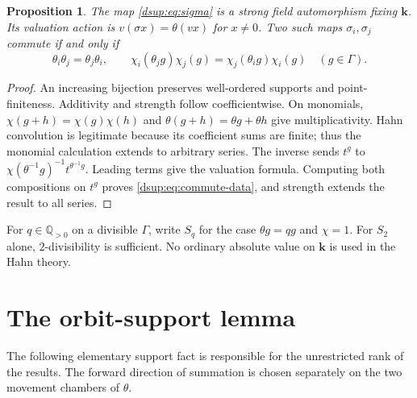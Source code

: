 \documentclass[11pt,oneside]{article}
\numberwithin{equation}{section}
\newtheorem{proposition}[theorem]{Proposition}
\theoremstyle{definition}
\theoremstyle{remark}
\newcommand{\Q}{\mathbb Q}
\newcommand{\kk}{\mathbf k}
\begin{document}
\begin{proposition}\label{dsup:prop:monomial}
The map \eqref{dsup:eq:sigma} is a strong field automorphism fixing $\kk$.
Its valuation action is $v(\sigma x)=\theta(vx)$ for $x\ne0$. Two such
maps $\sigma_i,\sigma_j$ commute if and only if
\begin{equation}\label{dsup:eq:commute-data}
 \theta_i\theta_j=\theta_j\theta_i,\qquad
 \chi_i(\theta_jg)\chi_j(g)=\chi_j(\theta_i g)\chi_i(g)
 \quad(g\in\Gamma).
\end{equation}
\end{proposition}
\begin{proof}
An increasing bijection preserves well-ordered supports and point-finiteness.
Additivity and strength follow coefficientwise. On monomials,
$\chi(g+h)=\chi(g)\chi(h)$ and $\theta(g+h)=\theta g+\theta h$ give
multiplicativity. Hahn convolution is legitimate because its coefficient
sums are finite; thus the monomial calculation extends to arbitrary
series. The inverse sends $t^g$ to
$\chi(\theta^{-1}g)^{-1}t^{\theta^{-1}g}$. Leading terms give the valuation
formula. Computing both compositions on $t^g$ proves
\eqref{dsup:eq:commute-data}, and strength extends the result to all series.
\end{proof}

For $q\in\Q_{>0}$ on a divisible $\Gamma$, write $S_q$ for the case
$\theta g=qg$ and $\chi=1$. For $S_2$ alone, $2$-divisibility is sufficient.
No ordinary absolute value on $\kk$ is used in the Hahn theory.

\section{The orbit-support lemma}\label{dsup:sec:orbits}

The following elementary support fact is responsible for the unrestricted
rank of the results. The forward direction of summation is chosen
separately on the two movement chambers of $\theta$.
\end{document}
